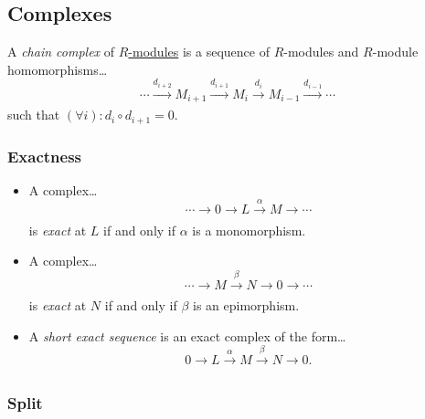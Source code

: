 \subsection{Complexes}\label{complexes}
A \emph{chain complex} of \hyperref[modules]{$R$-modules} is a sequence of $R$-modules and $R$-module homomorphisms\dots
$$\cdots \xrightarrow[]{d_{i+2}}  M_{i+1}  \xrightarrow[]{d_{i+1}} M_{i}\xrightarrow[]{d_{i}} M_{i-1} \xrightarrow[]{d_{i-1}} \cdots$$
such that $(\forall i) : d_i \circ d_{i+1} = 0.$

\subsubsection{Exactness}\label{exact}
\begin{itemize}
  \item A complex\dots
$$\cdots \rightarrow 0 \rightarrow L \xrightarrow[]{\alpha} M \rightarrow \cdots$$
is \emph{exact} at $L$ if and only if $\alpha$ is a monomorphism.
  \item A complex\dots
$$\cdots \rightarrow M \xrightarrow[]{\beta} N \rightarrow 0 \rightarrow \cdots$$
is \emph{exact} at $N$ if and only if $\beta$ is an epimorphism.
  \item A \emph{short exact sequence}\label{shortexactsequence} is an exact complex of the form\dots
$$0 \rightarrow L \xrightarrow[]{\alpha} M \xrightarrow[]{\beta} N \rightarrow 0.$$
\end{itemize}
 
\subsubsection{Split}\label{split}